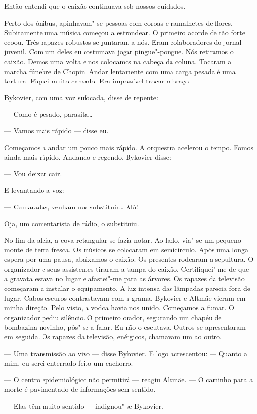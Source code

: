 Então entendi que o caixão continuava sob nossos cuidados.

Perto dos ônibus, apinhavam"-se pessoas com coroas e ramalhetes de
flores. Subitamente uma música começou a estrondear. O primeiro acorde
de tão forte ecoou. Três rapazes robustos se juntaram a nós. Eram
colaboradores do jornal juvenil. Com um deles eu costumava jogar
pingue"-pongue. Nós retiramos o caixão. Demos uma volta e nos colocamos
na cabeça da coluna. Tocaram a marcha fúnebre de Chopin. Andar
lentamente com uma carga pesada é uma tortura. Fiquei muito cansado. Era
impossível trocar o braço.

Bykovier, com uma voz sufocada, disse de repente:

--- Como é pesado, parasita\ldots{}

--- Vamos mais rápido --- disse eu.

Começamos a andar um pouco mais rápido. A orquestra acelerou o tempo.
Fomos ainda mais rápido. Andando e regendo. Bykovier disse:

--- Vou deixar cair.

E levantando a voz:

--- Camaradas, venham nos substituir\ldots{} Alô!

Oja, um comentarista de rádio, o substituiu.

No fim da aleia, a cova retangular se fazia notar. Ao lado, via"-se um
pequeno monte de terra fresca. Os músicos se colocaram em semicírculo.
Após uma longa espera por uma pausa, abaixamos o caixão. Os presentes
rodearam a sepultura. O organizador e seus assistentes tiraram a tampa
do caixão. Certifiquei"-me de que a gravata estava no lugar e afastei"-me
para as árvores. Os rapazes da televisão começaram a instalar o
equipamento. A luz intensa das lâmpadas parecia fora de lugar. Cabos
escuros contrastavam com a grama. Bykovier e Altmäe vieram em minha
direção. Pelo visto, a vodca havia nos unido. Começamos a fumar. O
organizador pediu silêncio. O primeiro orador, segurando um chapéu de
bombazina novinho, pôs"-se a falar. Eu não o escutava. Outros se
apresentaram em seguida. Os rapazes da televisão, enérgicos, chamavam um
ao outro.

--- Uma transmissão ao vivo --- disse Bykovier. E logo acrescentou: ---
Quanto a mim, eu serei enterrado feito um cachorro.

--- O centro epidemiológico não permitirá --- reagiu Altmäe. --- O
caminho para a morte é pavimentado de informações sem sentido.

--- Elas têm muito sentido --- indignou"-se Bykovier.

